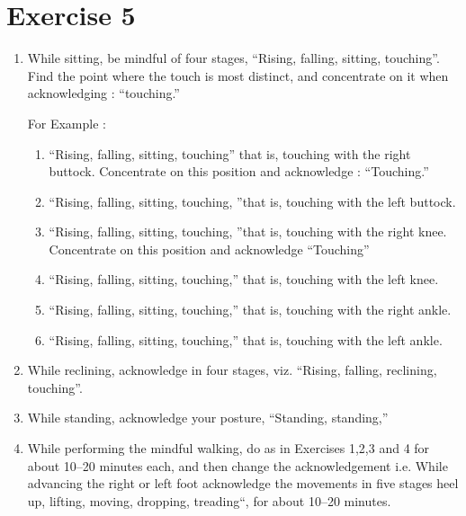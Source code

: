 \documentclass[a5paper,10pt,english]{book}
\begin{document}
\section{Exercise 5}
\label{\detokenize{practice:exercise-5}}\begin{enumerate}
%
\item {} 
\sphinxAtStartPar
While sitting, be mindful of four stages, “Rising, falling, sitting, touching”. Find the point where the touch is most distinct, and concentrate on it when acknowledging : “touching.”

\sphinxAtStartPar
For Example :
\begin{enumerate}
%
\item {} 
\sphinxAtStartPar
“Rising, falling, sitting, touching” that is, touching with the right buttock. Concentrate on this position and acknowledge : “Touching.”

\item {} 
\sphinxAtStartPar
“Rising, falling, sitting, touching, ”that is, touching with the left buttock.

\item {} 
\sphinxAtStartPar
“Rising, falling, sitting, touching, ”that is, touching with the right knee. Concentrate on this position and acknowledge “Touching”

\item {} 
\sphinxAtStartPar
“Rising, falling, sitting, touching,” that is, touching with the left knee.

\item {} 
\sphinxAtStartPar
“Rising, falling, sitting, touching,” that is, touching with the right ankle.

\item {} 
\sphinxAtStartPar
“Rising, falling, sitting, touching,” that is, touching with the left ankle.

\end{enumerate}

\item {} 
\sphinxAtStartPar
While reclining, acknowledge in four stages, viz. “Rising, falling, reclining, touching”.

\item {} 
\sphinxAtStartPar
While standing, acknowledge your posture, “Standing, standing,”

\item {} 
\sphinxAtStartPar
While performing the mindful walking, do as in Exercises 1,2,3 and 4 for about 10–20 minutes each, and then change the acknowledgement i.e. While advancing the right or left foot acknowledge the movements in five stages heel up, lifting, moving, dropping, treading“, for about 10–20 minutes.

\end{enumerate}
\end{document}
